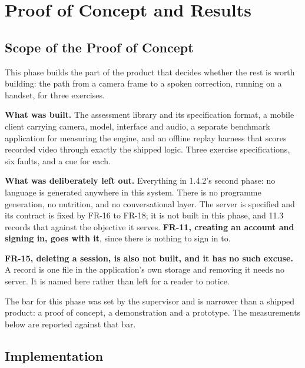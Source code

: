 \chapter{Proof of Concept and Results}
\label{chap:9}

\section{Scope of the Proof of Concept}
\label{sec:9.1}

This phase builds the part of the product that decides whether the rest is worth building: the path from a camera frame to a spoken correction, running on a handset, for three exercises.

\textbf{What was built.} The assessment library and its specification format, a mobile client carrying camera, model, interface and audio, a separate benchmark application for measuring the engine, and an offline replay harness that scores recorded video through exactly the shipped logic. Three exercise specifications, six faults, and a cue for each.

\textbf{What was deliberately left out.} Everything in 1.4.2's second phase: no language is generated anywhere in this system. There is no programme generation, no nutrition, and no conversational layer. The server is specified and its contract is fixed by FR-16 to FR-18; it is not built in this phase, and 11.3 records that against the objective it serves. \textbf{FR-11, creating an account and signing in, goes with it}, since there is nothing to sign in to.

\textbf{FR-15, deleting a session, is also not built, and it has no such excuse.} A record is one file in the application's own storage and removing it needs no server. It is named here rather than left for a reader to notice.

The bar for this phase was set by the supervisor and is narrower than a shipped product: a proof of concept, a demonstration and a prototype. The measurements below are reported against that bar.

\section{Implementation}
\label{sec:9.2}

